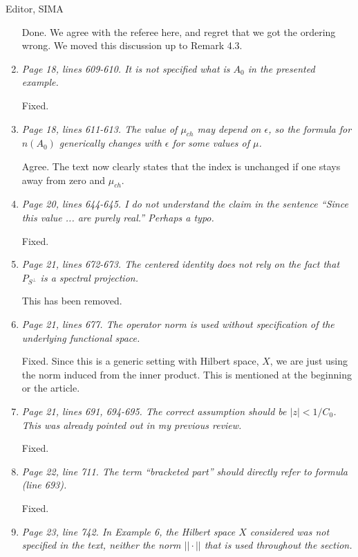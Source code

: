 \documentclass[11pt]{letter}
\begin{document}
\begin{letter}{Editor, SIMA}
\begin{enumerate}
Done.  We agree with the referee here, and regret that we got the ordering wrong.  We moved this discussion up to Remark 4.3.

\item \emph{Page 18, lines 609-610. It is not specified what is $A_0$ in the presented example.}
\vspace{4mm}

Fixed.

\item \emph{Page 18, lines 611-613. The value of $\mu_{ch}$ may depend on $\epsilon$, so the formula for $n(A_0)$ generically changes with $\epsilon$ for some values of $\mu$.}
\vspace{4mm}

Agree. The text now clearly states that the index is unchanged if one stays away from zero and $\mu_{ch}$.

\item \emph{Page 20, lines 644-645. I do not understand the claim in the sentence ``Since this value ... are purely real.'' Perhaps a typo.}
\vspace{4mm}

Fixed.

\item \emph{Page 21, lines 672-673. The centered identity does not rely on the fact that $P_{S^\perp}$ is a spectral projection.}

This has been removed.

\item \emph{Page 21, lines 677. The operator norm is used without specification of the underlying functional space.}
\vspace{4mm}

Fixed. Since this is a generic setting with Hilbert space, $X$, we are just using the norm induced from the inner product.  This is mentioned at the beginning or the article.

\item \emph{Page 21, lines 691, 694-695. The correct assumption should be $|z| < 1/C_0$. This was already pointed out in my previous review.}
\vspace{4mm}

Fixed.

\item \emph{Page 22, line 711. The term ``bracketed part'' should directly refer to formula (line 693).}
\vspace{4mm}

Fixed.

\item \emph{Page 23, line 742. In Example 6, the Hilbert space $X$ considered was not specified in the text, neither the norm $||\cdot||$ that is used throughout the section.}
\vspace{4mm}


\end{enumerate}
\end{letter}
\end{document}
